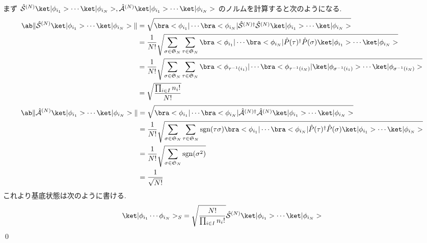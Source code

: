 \documentclass[uplatex,dvipdfmx,a4paper,11pt]{jlreq}
\makeatletter
\DeclareMathOperator{\sgn}{sgn}
\renewcommand{\SS}{\mathfrak{S}}
\renewcommand{\S}{\mathcal{S}}
\newcommand{\A}{\mathcal{A}}
\numberwithin{equation}{section}
\theoremstyle{definition}
\renewenvironment{proof}[1][\proofname]{\par
  \normalfont
  \topsep6\p@\@plus6\p@ \trivlist
  \item[\hskip\labelsep{\bfseries #1}\@addpunct{\bfseries}]\ignorespaces\quad\par
}{%
  \qed\endtrivlist\@endpefalse
}
\renewcommand\proofname{証明}
\makeatother
\begin{document}
\begin{proof}
  まず $\hat{\S}^{(N)}\ket|\phi_{i_1}>\cdots\ket|\phi_{i_N}>, \hat{\A}^{(N)}\ket|\phi_{i_1}>\cdots\ket|\phi_{i_N}>$ のノルムを計算すると次のようになる.
  \begin{align}
    \ab\|\hat{\S}^{(N)}\ket|\phi_{i_1}>\cdots\ket|\phi_{i_N}>\| & = \sqrt{\bra<\phi_{i_1}|\cdots\bra<\phi_{i_N}|\hat{\S}^{(N)\dagger}\hat{\S}^{(N)}\ket|\phi_{i_1}>\cdots\ket|\phi_{i_N}>}                                                                  \\
                                                                & = \frac{1}{N!}\sqrt{\sum_{\sigma\in\SS_N}\sum_{\tau\in\SS_N}\bra<\phi_{i_1}|\cdots\bra<\phi_{i_N}|\hat{P}(\tau)^\dagger\hat{P}(\sigma)\ket|\phi_{i_1}>\cdots\ket|\phi_{i_N}>}             \\
                                                                & = \frac{1}{N!}\sqrt{\sum_{\sigma\in\SS_N}\sum_{\tau\in\SS_N}\bra<\phi_{\tau^{-1}(i_1)}|\cdots\bra<\phi_{\tau^{-1}(i_N)}|\ket|\phi_{\sigma^{-1}(i_1)}>\cdots\ket|\phi_{\sigma^{-1}(i_N)}>} \\
                                                                & = \sqrt{\frac{\prod_{i\in I}n_i!}{N!}}
  \end{align}
  \begin{align}
    \ab\|\hat{\A}^{(N)}\ket|\phi_{i_1}>\cdots\ket|\phi_{i_N}>\| & = \sqrt{\bra<\phi_{i_1}|\cdots\bra<\phi_{i_N}|\hat{\A}^{(N)\dagger}\hat{\A}^{(N)}\ket|\phi_{i_1}>\cdots\ket|\phi_{i_N}>}                                                                      \\
                                                                & = \frac{1}{N!}\sqrt{\sum_{\sigma\in\SS_N}\sum_{\tau\in\SS_N}\sgn(\tau\sigma)\bra<\phi_{i_1}|\cdots\bra<\phi_{i_N}|\hat{P}(\tau)^\dagger\hat{P}(\sigma)\ket|\phi_{i_1}>\cdots\ket|\phi_{i_N}>} \\
                                                                & = \frac{1}{N!}\sqrt{\sum_{\sigma\in\SS_N}\sgn(\sigma^2)}                                                                                                                                      \\
                                                                & = \frac{1}{\sqrt{N!}}
  \end{align}
  これより基底状態は次のように書ける.
  \begin{align}
    \ket|\phi_{i_1}\cdots\phi_{i_N}>_S & = \sqrt{\frac{N!}{\prod_{i\in I}n_i!}}\hat{\S}^{(N)}\ket|\phi_{i_1}>\cdots\ket|\phi_{i_N}> \\

\end{align}
\end{proof}
\end{document}
